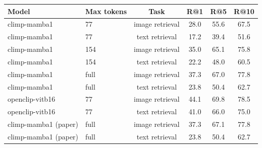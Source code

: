 \begin{tabular}{llcccc}
\toprule
Model & Max tokens & Task & R@1 & R@5 & R@10 \\
\midrule
climp-mamba1 & 77 & image retrieval & 28.0 & 55.6 & 67.5 \\
climp-mamba1 & 77 & text retrieval & 17.2 & 39.4 & 51.6 \\
climp-mamba1 & 154 & image retrieval & 35.0 & 65.1 & 75.8 \\
climp-mamba1 & 154 & text retrieval & 22.2 & 48.0 & 60.5 \\
climp-mamba1 & full & image retrieval & 37.3 & 67.0 & 77.8 \\
climp-mamba1 & full & text retrieval & 23.8 & 50.4 & 62.7 \\
openclip-vitb16 & 77 & image retrieval & 44.1 & 69.8 & 78.5 \\
openclip-vitb16 & 77 & text retrieval & 41.0 & 66.0 & 75.0 \\
climp-mamba1 (paper) & full & image retrieval & 37.3 & 67.1 & 77.8 \\
climp-mamba1 (paper) & full & text retrieval & 23.8 & 50.4 & 62.7 \\
\bottomrule
\end{tabular}
